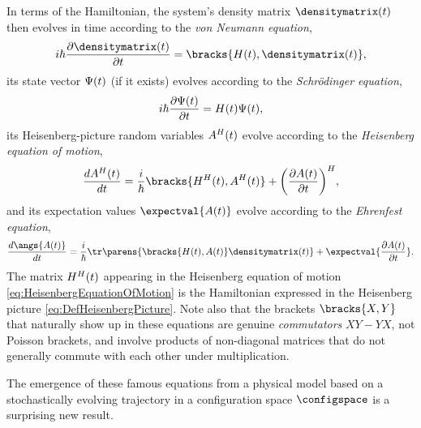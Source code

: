 \documentclass[12pt,english,prl,superscriptaddress,nobibnotes,nofootinbib]{revtex4-2}
\let\originalleft\left
\let\originalright\right
\renewcommand{\left}{\mathopen{}\mathclose\bgroup\originalleft}
\renewcommand{\right}{\aftergroup\egroup\originalright}
\begin{document}
In terms of the Hamiltonian, the system's density matrix $\densitymatrix\left(t\right)$
then evolves in time according to the \emph{von Neumann equation},
\begin{equation}
i\hbar\frac{\partial\densitymatrix\left(t\right)}{\partial t}=\bracks{H\left(t\right),\densitymatrix\left(t\right)},\label{eq:VonNeumannEq}
\end{equation}
 its state vector $\Psi\left(t\right)$ (if it exists) evolves according
to the \emph{Schr{\" o}dinger equation}, 
\begin{equation}
i\hbar\frac{\partial\Psi\left(t\right)}{\partial t}=H\left(t\right)\Psi\left(t\right),\label{eq:SchrodingerEq}
\end{equation}
 its Heisenberg-picture random variables $A^{H}\left(t\right)$ evolve
according to the \emph{Heisenberg equation of motion}, 
\begin{equation}
\frac{dA^{H}\left(t\right)}{dt}=\frac{i}{\hbar}\bracks{H^{H}\left(t\right),A^{H}\left(t\right)}+\left(\frac{\partial A\left(t\right)}{\partial t}\right)^{H},\label{eq:HeisenbergEquationOfMotion}
\end{equation}
 and its expectation values $\expectval{A\left(t\right)}$ evolve
according to the \emph{Ehrenfest equation}, 
\begin{equation}
\frac{d\angs{A\left(t\right)}}{dt}=\frac{i}{\hbar}\tr\parens{\bracks{H\left(t\right),A\left(t\right)}\densitymatrix\left(t\right)}+\expectval{\frac{\partial A\left(t\right)}{\partial t}}.\label{eq:EhrenfestEquation}
\end{equation}
 The matrix $H^{H}\left(t\right)$ appearing in the Heisenberg equation
of motion \eqref{eq:HeisenbergEquationOfMotion} is the Hamiltonian
expressed in the Heisenberg picture \eqref{eq:DefHeisenbergPicture}.
Note also that the brackets $\bracks{X,Y}$ that naturally show up
in these equations are genuine \emph{commutators} $XY-YX$, not Poisson
brackets, and involve products of non-diagonal matrices that do not
generally commute with each other under multiplication.

The emergence of these famous equations from a physical model based
on a stochastically evolving trajectory in a configuration space $\configspace$
is a surprising new result.
\end{document}
